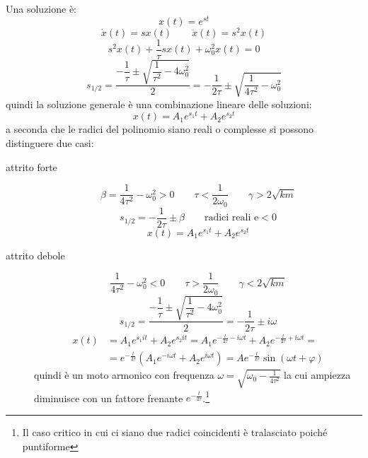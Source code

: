 Una soluzione è:
\begin{equation*}x(t)=e^{st}\end{equation*}
\begin{equation*}\dot x(t)=sx(t)\qquad \ddot x(t)=s^2x(t)\end{equation*}
\begin{equation*}s^2x(t)+\frac{1}{\tau}sx(t)+\omega_0^2x(t)=0\end{equation*}
\begin{equation*}s_{1/2}=\dfrac{-\dfrac{1}{\tau}\pm\sqrt{\dfrac{1}{\tau^2}-4\omega_0^2}}{2}=-\frac{1}{2\tau}\pm\sqrt{\frac{1}{4\tau^2}-\omega_0^2}\end{equation*}
quindi la soluzione generale è una combinazione lineare delle soluzioni:
\begin{equation*}
 x(t)=A_1e^{s_1t}+A_2e^{s_2t}
\end{equation*}
a seconda che le radici del polinomio siano reali o complesse si possono distinguere due casi:
\begin{description}
\item[attrito forte]
\begin{equation*}\beta=\frac{1}{4\tau^2}-\omega_0^2>0\qquad\tau<\frac{1}{2\omega_0}\qquad\gamma>2\sqrt{km}\end{equation*}
\begin{equation*}s_{1/2}=-\frac{1}{2\tau}\pm\beta\qquad\text{radici reali e}<0\end{equation*}
\begin{equation*}x(t)=A_1e^{s_1t}+A_2e^{s_2t}\end{equation*}
\item[attrito debole]
\begin{equation*}\frac{1}{4\tau^2}-\omega_0^2<0\qquad \tau>\frac{1}{2\omega_0}\qquad\gamma<2\sqrt{km}\end{equation*}
\begin{equation*}s_{1/2}=\dfrac{-\dfrac{1}{\tau}\pm\sqrt{\dfrac{1}{\tau^2}-4\omega_0^2}}{2}=-\frac{1}{2\tau}\pm i\omega\end{equation*}
\begin{align*}x(t)&=A_1e^{s_1it}+A_2e^{s_2it}=A_1e^{-\frac{t}{2\tau}-i\omega t}+A_2e^{-\frac{t}{2\tau}+i\omega t}=\\
&=e^{-\frac{t}{2\tau}}\left(A_1e^{-i\omega t}+A_2e^{i\omega t}\right)=A e^{-\frac{t}{2\tau}}\sin(\omega t +\varphi)\end{align*}
quindi è un moto armonico con frequenza $\omega=\sqrt{\omega_0-\frac{1}{4\tau^2}}$ la cui ampiezza diminuisce con un fattore frenante $e^{-\frac{t}{2\tau}}$.\footnote{Il caso critico in cui ci siano due radici coincidenti è tralasciato poiché puntiforme}
\end{description}

